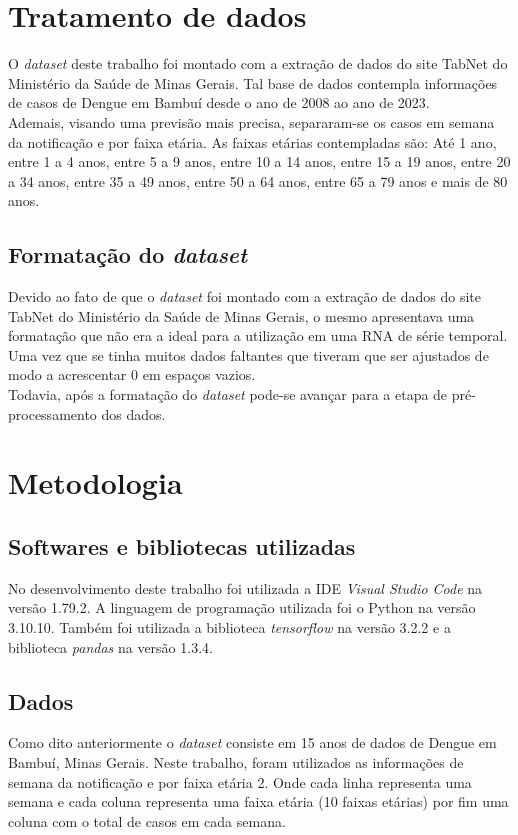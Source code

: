 \documentclass[
	article,			%
	12pt,				%
	a4paper,			%
	chapter=TITLE,		%
	section=TITLE,		%
	subsection=TITLE,	%
	subsubsection=TITLE %
	english,			%
	brazil,				%
	sumario=tradicional
	]{abntex2}
\begin{document}
\section{Tratamento de dados}
O \textit{dataset} deste trabalho foi montado com a extração de dados do site TabNet do Ministério da Saúde de Minas Gerais. Tal base de dados contempla informações de casos de Dengue em Bambuí desde o ano de 2008 ao ano de 2023. 
\\ \indent Ademais, visando uma previsão mais precisa, separaram-se os casos em semana da notificação e por faixa etária. 
As faixas etárias contempladas são: Até 1 ano, entre 1 a 4 anos, entre 5 a 9 anos, entre 10 a 14 anos, entre 15 a 19 anos, entre 20 a 34 anos, entre 35 a 49 anos, entre 50 a 64 anos, entre 65 a 79 anos e mais de 80 anos.
\subsection{Formatação do \textit{dataset}}
Devido ao fato de que o \textit{dataset} foi montado com a extração de dados do site TabNet do Ministério da Saúde de Minas Gerais, o mesmo apresentava uma formatação que não era a ideal para a utilização em uma RNA de série temporal. Uma vez que se tinha muitos dados faltantes que tiveram que ser ajustados de modo a acrescentar 0 em espaços vazios.
\\ \indent
Todavia, após a formatação do \textit{dataset} pode-se avançar para a etapa de pré-processamento dos dados.


\section{Metodologia}
\subsection{Softwares e bibliotecas utilizadas}
No desenvolvimento deste trabalho foi utilizada a IDE \textit{Visual Studio Code} na versão 1.79.2. A linguagem de programação utilizada foi o Python na versão 3.10.10. 
Também foi utilizada a biblioteca \textit{tensorflow} na versão 3.2.2 e a biblioteca \textit{pandas} na versão 1.3.4. 

\subsection{Dados}
Como dito anteriormente o \textit{dataset} consiste em 15 anos de dados de Dengue em Bambuí, Minas Gerais. Neste trabalho, foram utilizados as informações de semana da notificação e por faixa etária 2. Onde cada linha representa uma semana e cada coluna representa uma faixa etária (10 faixas etárias) por fim uma coluna com o total de casos em cada semana.
\end{document}
